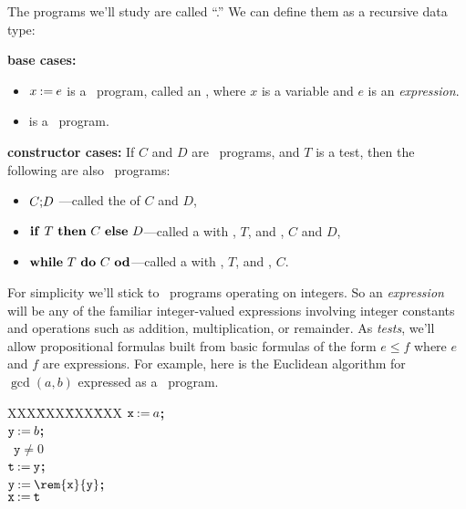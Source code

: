 The programs we'll study are called ``.''  We
can define them as a recursive data type:
\begin{definition}\label{whiledef} \mbox{}

\textbf{base cases:}
\begin{itemize}

\item $x \mathbin{\mathtt{:=}} e$ is a \while\ program, called an , where $x$ is a variable and $e$ is an \emph{expression}.

\item \term{$\halt$} is a \while\ program.

\end{itemize}

\textbf{constructor cases:}
If $C$ and $D$ are \while\ programs, and $T$ is a test, then the following are also
\while\ programs:
\begin{itemize}

\item $C\mathbf{;}D$
---called the  of $C$ and $D$,

\item $\text{\textbf{if}}\ T\ \text{\textbf{then}}\ C\ \text{\textbf{else}}\ D$---called a  with
  , $T$, and , $C$ and $D$,

\item $\text{\textbf{while}}\ T\ \text{\textbf{do}}\ C\ \text{\textbf{od}}$---called a  with , $T$, and , $C$.

\end{itemize}
\end{definition}

For simplicity we'll stick to \while\ programs operating on integers.
So an \emph{expression} will be any of the familiar integer-valued
expressions involving integer constants and operations such as
addition, multiplication, or remainder.  As \emph{tests}, we'll allow
propositional formulas built from basic formulas of the form $e \leq
f$ where $e$ and $f$ are expressions.  For example, here is the
Euclidean algorithm for $\gcd(a,b)$ expressed as a \while\ program.
\begin{center}
\begin{tabbing}
XXX\=XXX\=XXX\=XXX\kill
$\mathtt{x} \mathbin{\mathtt{:=}} a$\textbf{;} \\
$\mathtt{y} \mathbin{\mathtt{:=}} b$\textbf{;} \\
\while\ $\mathtt{y} \neq 0$ \docomm\\
   \> $\mathtt{t} \mathbin{\mathtt{:=}} \mathtt{y}$\textbf{;}\\
   \> $\mathtt{y} \assigned \rem{\mathtt{x}}{\mathtt{y}}$\textbf{;}\\
   \> $\mathtt{x} \mathbin{\mathtt{:=}} \mathtt{t}$
\odcomm\\
\end{tabbing}
\end{center}

